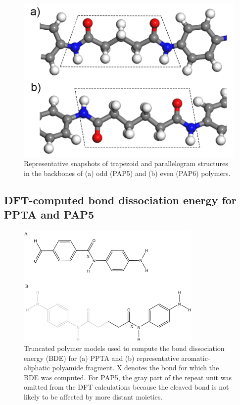 \documentclass[journal=langd5,manuscript=article]{achemso}
\begin{document}
\begin{figure}[h!]
\centering
\includegraphics[scale=0.35]{Figure S3 Parallelogram and Trapezoid.png}
\caption{Representative snapshots of trapezoid and parallelogram structures in the backbones of (a) odd (PAP5) and (b) even (PAP6) polymers. 
}
\label{fig:ParallelogramANDTrapezoid}
\end{figure}

\FloatBarrier
\subsection{DFT-computed bond dissociation energy for PPTA and PAP5}

\begin{figure}[h!]
\centering
\includegraphics[width=0.8\textwidth]{DFT_figure_chemdraw.png}
\caption{Truncated polymer models used to compute the bond dissociation
energy (BDE) for (a) PPTA and (b) representative aromatic-aliphatic polyamide fragment.
X denotes the bond for which the BDE was computed.
For PAP5, the gray part of the repeat unit was omitted from the DFT calculations
because the cleaved bond is not likely to be affected by more distant
moieties.
}
\label{fig:DFT}
\end{figure}
\end{document}
